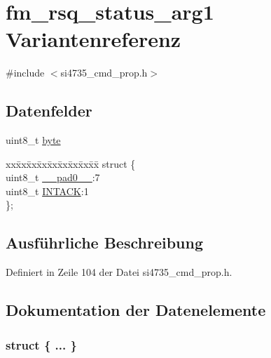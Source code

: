\hypertarget{unionfm__rsq__status__arg1}{}\section{fm\+\_\+rsq\+\_\+status\+\_\+arg1 Variantenreferenz}
\label{unionfm__rsq__status__arg1}


{\ttfamily \#include $<$si4735\+\_\+cmd\+\_\+prop.\+h$>$}

\subsection*{Datenfelder}
\begin{DoxyCompactItemize}
\item 
uint8\+\_\+t \hyperlink{unionfm__rsq__status__arg1_a96f44d20f1dbf1c8785a7bc99a46164c}{byte}
\item 
\begin{tabbing}
xx\=xx\=xx\=xx\=xx\=xx\=xx\=xx\=xx\=\kill
struct \{\\
\>uint8\_t \hyperlink{unionfm__rsq__status__arg1_a8b4eebe79ded0459acec2f4950102ba3}{\_\_pad0\_\_}:7\\
\>uint8\_t \hyperlink{unionfm__rsq__status__arg1_adf4f80d8fb205d6c93c6423d84d63d9c}{INTACK}:1\\
\}; \\

\end{tabbing}\end{DoxyCompactItemize}


\subsection{Ausführliche Beschreibung}


Definiert in Zeile 104 der Datei si4735\+\_\+cmd\+\_\+prop.\+h.



\subsection{Dokumentation der Datenelemente}
\hypertarget{unionfm__rsq__status__arg1_afaae38c91ecca762321bfca0cd92466a}{}\subsubsection[{"@13}]{\setlength{\rightskip}{0pt plus 5cm}struct \{ ... \} }\label{unionfm__rsq__status__arg1_afaae38c91ecca762321bfca0cd92466a}
\hypertarget{unionfm__rsq__status__arg1_a8b4eebe79ded0459acec2f4950102ba3}{}
